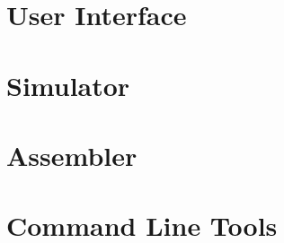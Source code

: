 \documentclass[a4paper,twosided, 15pt]{book}
\begin{document}
    \chapter{User Interface}
        

    \chapter{Simulator}
        

    \chapter{Assembler}
        

    \chapter{Command Line Tools}
        

    \printindex
    \listoftables
\end{document}
